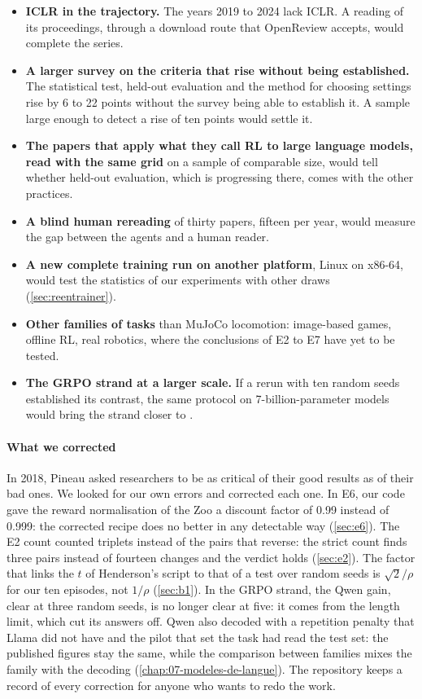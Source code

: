 \begin{itemize}
  \item \textbf{ICLR in the trajectory.} The years 2019 to 2024 lack ICLR. A reading of its
        proceedings, through a download route that OpenReview accepts, would complete the series.
  \item \textbf{A larger survey on the criteria that rise without being established.} The
        statistical test, held-out evaluation and the method for choosing settings rise by 6 to 22
        points without the survey being able to establish it. A sample large enough to detect a rise of ten
        points would settle it.
  \item \textbf{The papers that apply what they call RL to large language models, read with the same
        grid} on a sample of comparable size, would tell whether held-out evaluation, which is
        progressing there, comes with the other practices.
  \item \textbf{A blind human rereading} of thirty papers, fifteen per year, would measure the gap between
        the agents and a human reader.
  \item \textbf{A new complete training run on another platform}, Linux on x86-64, would test the
        statistics of our experiments with other draws (\cref{sec:reentrainer}).
  \item \textbf{Other families of tasks} than MuJoCo locomotion: image-based games, offline RL, real
        robotics, where the conclusions of E2 to E7 have yet to be tested.
  \item \textbf{The GRPO strand at a larger scale.} If a rerun with ten random seeds established its contrast, the same protocol on 7-billion-parameter models would bring the strand closer to
        \textcite{shao2025spurious}.
\end{itemize}

\paragraph{What we corrected}
In 2018, Pineau asked researchers to be as critical of their good results as of their bad ones. We
looked for our own errors and corrected each one. In E6, our code gave the reward normalisation of
the Zoo a discount factor of 0.99 instead of 0.999: the corrected recipe does no better in any
detectable way (\cref{sec:e6}). The E2 count counted triplets instead of the pairs that reverse: the
strict count finds three pairs instead of fourteen changes and the verdict holds (\cref{sec:e2}). The
factor that links the $t$ of Henderson's script to that of a test over random seeds is $\sqrt2/\rho$
for our ten episodes, not $1/\rho$ (\cref{sec:b1}). In the GRPO strand, the Qwen gain, clear at three
random seeds, is no longer clear at five: it comes from the length limit, which cut its answers off.
Qwen also decoded with a repetition penalty that Llama did not have and the pilot that set the task
had read the test set: the published figures stay the same, while the comparison between families
mixes the family with the decoding (\cref{chap:07-modeles-de-langue}). The repository keeps a record
of every correction for anyone who wants to redo the work.

